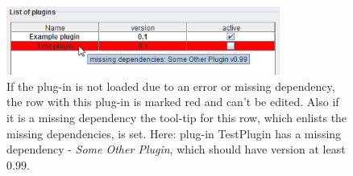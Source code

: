 \documentclass{article}
\begin{document}
\begin{figure}
\includegraphics[width=0.8\textwidth]{missing_dependencies.png}
\caption{
If the plug-in is not loaded due to an error or missing dependency, the row with this plug-in is marked red and can't be edited.
Also if it is a missing dependency the tool-tip for this row, which enlists the missing dependencies, is set.\newline
Here: plug-in TestPlugin has a missing dependency - \textit{Some Other Plugin}, which should have version at least $0.99$.
}
\label{missing_dependencies}
\end{figure}
\end{document}
